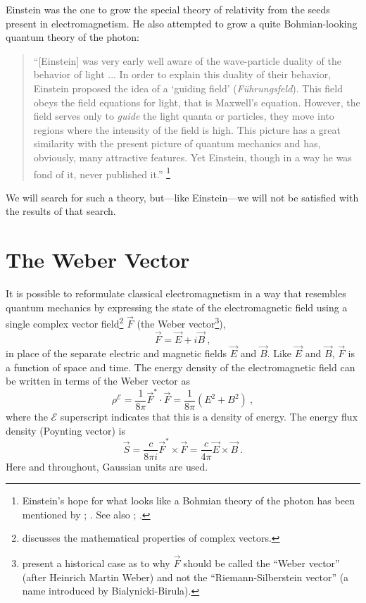 \documentclass[12pt,secnumarabic,amsmath,amssymb,balancelastpage,nofootinbib]{article}
\begin{document}
Einstein was the one to grow the special theory of relativity from the seeds present in electromagnetism.  He also attempted to grow a quite Bohmian-looking quantum theory of the photon:
\begin{quote}
``[Einstein] was very early well aware of the wave-particle duality of the behavior of light ... In order to explain this duality of their behavior, Einstein proposed the idea of a `guiding field' (\textit{F\"{u}hrungsfeld}).  This field obeys the field equations for light, that is Maxwell's equation.  However, the field serves only to \emph{guide} the light quanta or particles, they move into regions where the intensity of the field is high.  This picture has a great similarity with the present picture of quantum mechanics and has, obviously, many attractive features.  Yet Einstein, though in a way he was fond of it, never published it.'' \citep[pg.\ 463]{wigner1980}\footnote{Einstein's hope for what looks like a Bohmian theory of the photon has been mentioned by \citet[pg.\ 538]{holland}; \citet{kiessling2017}.  See also \citet[pg.\ 440--443]{pais1982}; \citet[pg.\ 262]{wigner1983}.}
\end{quote}
We will search for such a theory, but---like Einstein---we will not be satisfied with the results of that search.


\section{The Weber Vector}\label{RSsection}

It is possible to reformulate classical electromagnetism in a way that resembles quantum mechanics by expressing the state of the electromagnetic field using a single complex vector field\footnote{\citet[ch.\ 1]{lindell1992} discusses the mathematical properties of complex vectors.} $\vec{F}$ (the Weber vector\footnote{\citet[appendix A]{kiessling2017} present a historical case as to why $\vec{F}$ should be called the ``Weber vector'' (after Heinrich Martin Weber) and not the ``Riemann-Silberstein vector'' (a name introduced by Bialynicki-Birula).}),
\begin{equation}
\vec{F}=\vec{E}+i\vec{B}
\ ,
\label{rsvector}
\end{equation}
in place of the separate electric and magnetic fields $\vec{E}$ and $\vec{B}$.  Like $\vec{E}$ and $\vec{B}$, $\vec{F}$ is a function of space and time.  The energy density of the electromagnetic field can be written in terms of the Weber vector as
\begin{equation}
\rho^{\mathcal{E}}=\frac{1}{8 \pi}\vec{F}^{*}\!\cdot\vec{F}=\frac{1}{8 \pi}\left(E^2+B^2\right)
\ ,
\label{energydensityfield}
\end{equation}
where the $\mathcal{E}$ superscript indicates that this is a density of energy.  The energy flux density (Poynting vector) is
\begin{equation}
\vec{S}=\frac{c}{8 \pi i}\vec{F}^*\times\vec{F}= \frac{c}{4\pi} \vec{E} \times \vec{B}
\ .
\label{poyntingvector}
\end{equation}
Here and throughout, Gaussian units are used.
\end{document}
